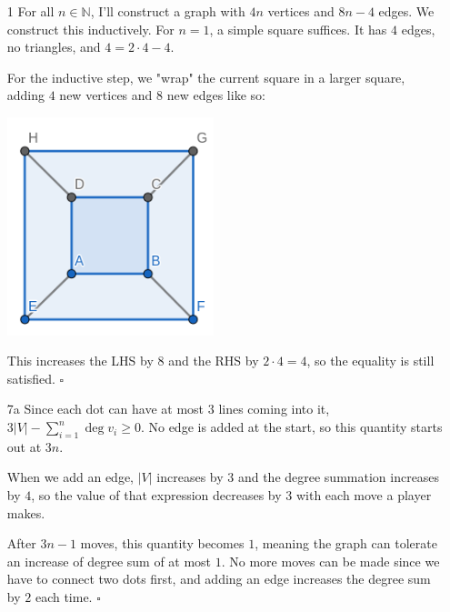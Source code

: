 \documentclass[12pt]{article}
\begin{document}
\begin{enumerate}
    \item[1] For all $n \in \mathbb{N}$, I'll construct a graph with $4n$ vertices and $8n-4$ edges.
        We construct this inductively.
        For $n=1$, a simple square suffices.
        It has $4$ edges, no triangles, and $4 = 2 \cdot 4 - 4$.

        For the inductive step, we "wrap" the current square in a larger square,
        adding $4$ new vertices and $8$ new edges like so:
        \begin{center}
            \includegraphics[width=6cm]{img/hw4/inductive_tri_free}
        \end{center}
        This increases the LHS by $8$ and the RHS by $2 \cdot 4 = 4$,
        so the equality is still satisfied. $\square$

    \item[7a] Since each dot can have at most $3$ lines coming into it,
        $3|V|-\sum_{i=1}^{n} \deg v_i \ge 0$.
        No edge is added at the start, so this quantity starts out at $3n$.

        When we add an edge, $|V|$ increases by $3$ and the degree summation increases by $4$,
        so the value of that expression decreases by $3$ with each move a player makes.

        After $3n-1$ moves, this quantity becomes $1$,
        meaning the graph can tolerate an increase of degree sum of at most $1$.
        No more moves can be made since we have to connect two dots first,
        and adding an edge increases the degree sum by $2$ each time. $\square$

        \pagebreak


\end{enumerate}
\end{document}
